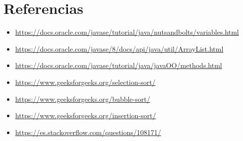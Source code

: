 \documentclass{article}
\begin{document}
\clearpage


\section{Referencias}
\begin{itemize}			
    \item \url{https://docs.oracle.com/javase/tutorial/java/nutsandbolts/variables.html}
    \item \url{https://docs.oracle.com/javase/8/docs/api/java/util/ArrayList.html}
    \item \url{https://docs.oracle.com/javase/tutorial/java/javaOO/methods.html}
    \item \url{https://www.geeksforgeeks.org/selection-sort/}
    \item \url{https://www.geeksforgeeks.org/bubble-sort/}
    \item \url{https://www.geeksforgeeks.org/insertion-sort/}
    \item \url{https://es.stackoverflow.com/questions/108171/}
\end{itemize}	
	
%
%
%
			
\end{document}
